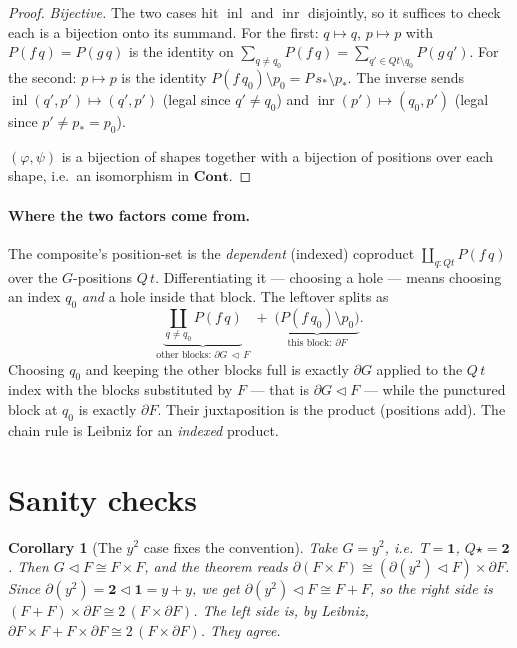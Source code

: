 \documentclass[11pt]{article}
\newtheorem{corollary}{Corollary}
\theoremstyle{definition}
\newcommand{\Cont}{\mathbf{Cont}}
\newcommand{\tri}{\mathbin{\triangleleft}}
\newcommand{\pd}{\partial}
\DeclareMathOperator{\inl}{inl}
\DeclareMathOperator{\inr}{inr}
\begin{document}
\begin{proof}
\emph{Bijective.} The two cases hit $\inl$ and $\inr$ disjointly, so it suffices
to check each is a bijection onto its summand. For the first: $q\mapsto q$,
$p\mapsto p$ with $P(f\,q)=P(g\,q)$ is the identity on
$\sum_{q\neq q_0}P(f\,q)=\sum_{q'\in Qt\setminus q_0}P(g\,q')$. For the second:
$p\mapsto p$ is the identity $P(f\,q_0)\setminus p_0 = P\,s_\ast\setminus p_\ast$.
The inverse sends $\inl(q',p')\mapsto(q',p')$ (legal since $q'\neq q_0$) and
$\inr(p')\mapsto(q_0,p')$ (legal since $p'\neq p_\ast=p_0$).

\medskip
$(\varphi,\psi)$ is a bijection of shapes together with a bijection of positions
over each shape, i.e.\ an isomorphism in $\Cont$.
\end{proof}

\paragraph{Where the two factors come from.}
The composite's position-set is the \emph{dependent} (indexed) coproduct
$\coprod_{q:Q t} P(f\,q)$ over the $G$-positions $Q\,t$. Differentiating it ---
choosing a hole --- means choosing an index $q_0$ \emph{and} a hole inside that
block. The leftover splits as
\[
  \underbrace{\coprod_{q\neq q_0} P(f\,q)}_{\text{other blocks: } \pd G\,\tri\,F}
  \;+\;
  \underbrace{\bigl(P(f\,q_0)\setminus p_0\bigr)}_{\text{this block: } \pd F}.
\]
Choosing $q_0$ and keeping the other blocks full is exactly $\pd G$ applied to
the $Q\,t$ index with the blocks substituted by $F$ --- that is $\pd G\tri F$ ---
while the punctured block at $q_0$ is exactly $\pd F$. Their juxtaposition is the
product (positions add). The chain rule is Leibniz for an \emph{indexed} product.

\section{Sanity checks}

\begin{corollary}[The $y^2$ case fixes the convention]
Take $G = y^2$, i.e.\ $T = \mathbf 1$, $Q\star = \mathbf 2$. Then
$G\tri F \cong F\times F$, and the theorem reads
$\pd(F\times F) \cong (\pd(y^2)\tri F)\times \pd F$. Since
$\pd(y^2) = \mathbf 2 \tri \mathbf 1 = y+y$, we get
$\pd(y^2)\tri F \cong F + F$, so the right side is
$(F+F)\times \pd F \cong 2\,(F\times \pd F)$. The left side is, by Leibniz,
$\pd F\times F + F\times \pd F \cong 2\,(F\times\pd F)$. They agree.
\end{corollary}
\end{document}
